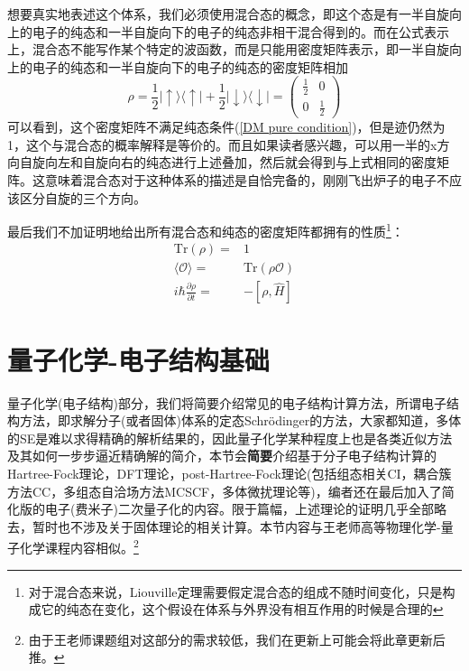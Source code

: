 \documentclass[12pt,a4paper,openany,twoside]{book}
\numberwithin{equation}{section}
\newcommand{\sch}{Schr\"odinger}
\begin{document}
        想要真实地表述这个体系，我们必须使用混合态的概念，即这个态是有一半自旋向上的电子的纯态和一半自旋向下的电子的纯态非相干混合得到的。而在公式表示上，混合态不能写作某个特定的波函数，而是只能用密度矩阵表示，即一半自旋向上的电子的纯态和一半自旋向下的电子的纯态的密度矩阵相加
        \begin{equation}
          \rho = \frac{1}{2} | \uparrow \rangle \langle \uparrow |+\frac{1}{2} | \downarrow \rangle \langle \downarrow |=\left(\begin{array}{ll}
            {\frac{1}{2}} & {0} \\
            {0} & {\frac{1}{2}}
          \end{array}\right)
        \end{equation}
        可以看到，这个密度矩阵不满足纯态条件(\ref{DM pure condition})，但是迹仍然为1，这个与混合态的概率解释是等价的。而且如果读者感兴趣，可以用一半的x方向自旋向左和自旋向右的纯态进行上述叠加，然后就会得到与上式相同的密度矩阵。这意味着混合态对于这种体系的描述是自恰完备的，刚刚飞出炉子的电子不应该区分自旋的三个方向。
        
        最后我们不加证明地给出所有混合态和纯态的密度矩阵都拥有的性质\footnote{对于混合态来说，Liouville定理需要假定混合态的组成不随时间变化，只是构成它的纯态在变化，这个假设在体系与外界没有相互作用的时候是合理的}：\\
        \begin{align*}
          \text{Tr}(\rho)=&1\\
          \langle\mathcal{O}\rangle=&\text{Tr}(\rho \mathcal{O})\\
          i \hbar \frac{\partial \rho}{\partial t}=&-[\rho,\hat{H}]
        \end{align*}
    

    \chapter{量子化学-电子结构基础}
      量子化学(电子结构)部分，我们将简要介绍常见的电子结构计算方法，所谓电子结构方法，即求解分子(或者固体)体系的定态\sch 的方法，大家都知道，多体的SE是难以求得精确的解析结果的，因此量子化学某种程度上也是各类近似方法及其如何一步步逼近精确解的简介，本节会\textbf{简要}介绍基于分子电子结构计算的Hartree-Fock理论，DFT理论，post-Hartree-Fock理论(包括组态相关CI，耦合簇方法CC，多组态自洽场方法MCSCF，多体微扰理论等)，编者还在最后加入了简化版的电子(费米子)二次量子化的内容。限于篇幅，上述理论的证明几乎全部略去，暂时也不涉及关于固体理论的相关计算。本节内容与王老师高等物理化学-量子化学课程内容相似。\footnote{由于王老师课题组对这部分的需求较低，我们在更新上可能会将此章更新后推。}
      
\end{document}
